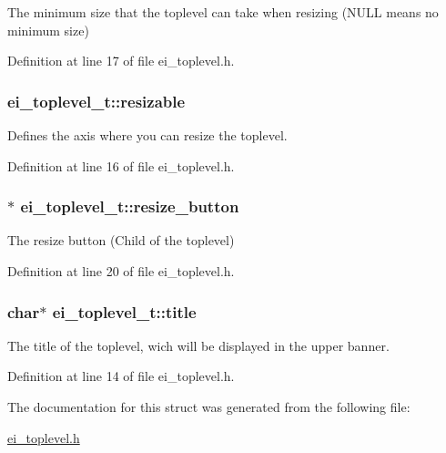 The minimum size that the toplevel can take when resizing (N\+U\+L\+L means no minimum size) 



Definition at line 17 of file ei\+\_\+toplevel.\+h.

\hypertarget{structei__toplevel__t_a20ca606f2d466eaab1996942d989f11b}{
\subsubsection[{resizable}]{ ei\+\_\+toplevel\+\_\+t\+::resizable}}\label{structei__toplevel__t_a20ca606f2d466eaab1996942d989f11b}


Defines the axis where you can resize the toplevel. 



Definition at line 16 of file ei\+\_\+toplevel.\+h.

\hypertarget{structei__toplevel__t_a417d86f20456e1e21b57f9665b5409c8}{
\subsubsection[{resize\+\_\+button}]{$\ast$ ei\+\_\+toplevel\+\_\+t\+::resize\+\_\+button}}\label{structei__toplevel__t_a417d86f20456e1e21b57f9665b5409c8}


The resize button (Child of the toplevel) 



Definition at line 20 of file ei\+\_\+toplevel.\+h.

\hypertarget{structei__toplevel__t_ad3b3d6a03d225a21c7b414357c678b1b}{
\subsubsection[{title}]{\setlength{\rightskip}{0pt plus 5cm}char$\ast$ ei\+\_\+toplevel\+\_\+t\+::title}}\label{structei__toplevel__t_ad3b3d6a03d225a21c7b414357c678b1b}


The title of the toplevel, wich will be displayed in the upper banner. 



Definition at line 14 of file ei\+\_\+toplevel.\+h.



The documentation for this struct was generated from the following file\+:\begin{DoxyCompactItemize}
\item 
\hyperlink{ei__toplevel_8h}{ei\+\_\+toplevel.\+h}\end{DoxyCompactItemize}
